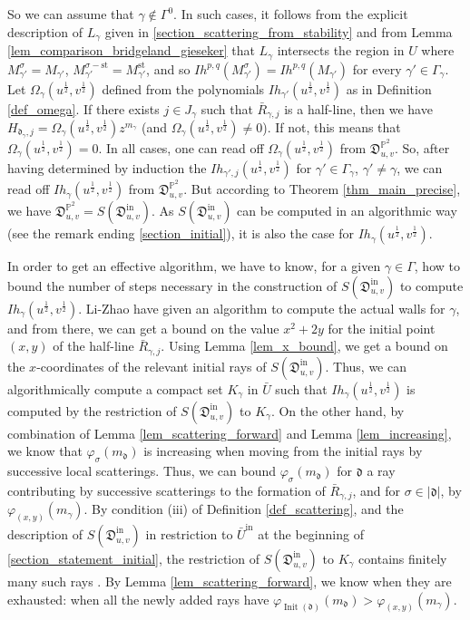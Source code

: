 \documentclass[12pt, a4paper]{amsart}
\newcommand\PP{\mathbb P}
\newcommand\fd{\mathfrak d}
\newcommand\fD{\mathfrak D}
\newcommand\Init{\operatorname{Init}}
\newcommand\st{\mathrm{st}}
\newcommand\iin{\mathrm{in}}
\begin{document}
So we can assume that $\gamma \notin \Gamma^0$. In such cases, it follows from the explicit description of $L_\gamma$ given in \cref{section_scattering_from_stability}
and from Lemma \ref{lem_comparison_bridgeland_gieseker} that
$L_\gamma$ intersects the region in $U$ where $M_{\gamma'}^\sigma=M_{\gamma'}$,
$M_{\gamma'}^{\sigma-\st}=M_{\gamma'}^\st$, and so $Ih^{p,q}(M_{\gamma'}^\sigma)=Ih^{p,q}(M_{\gamma'})$
for every $\gamma' \in \Gamma_\gamma$.
Let $\Omega_\gamma(u^{\frac{1}{2}},v^{\frac{1}{2}})$ defined from the 
polynomials $Ih_{\gamma'}(u^{\frac{1}{2}},v^{\frac{1}{2}})$ as in Definition 
\ref{def_omega}.
If there exists $j \in J_\gamma$ such that $\bar{R}_{\gamma,j}$ is a half-line, then we have  $H_{\fd_\gamma,j}=\Omega_\gamma(u^{\frac{1}{2}},v^{\frac{1}{2}}) z^{m_\gamma}$ (and $\Omega_\gamma(u^{\frac{1}{2}},v^{\frac{1}{2}}) \neq 0$).
If not, this means that $\Omega_\gamma(u^{\frac{1}{2}},v^{\frac{1}{2}})= 0$.
In all cases, one can read off $\Omega_\gamma(u^{\frac{1}{2}},v^{\frac{1}{2}})$
from $\fD_{u,v}^{\PP^2}$.
So, after having determined by induction the $Ih_{\gamma',j}(u^{\frac{1}{2}},
v^{\frac{1}{2}})$ for $\gamma' \in \Gamma_\gamma$, $\gamma' \neq \gamma$, we can read off 
$Ih_\gamma(u^{\frac{1}{2}},v^{\frac{1}{2}})$
from $\fD^{\PP^2}_{u,v}$.
But according to Theorem
\ref{thm_main_precise}, we have 
$\fD_{u,v}^{\PP^2}=S(\fD^\iin_{u,v})$. As 
$S(\fD^\iin_{u,v})$ can be computed in an algorithmic way (see the remark ending
\cref{section_initial}), it is also the case 
for $Ih_\gamma(u^{\frac{1}{2}}, v^{\frac{1}{2}})$.

In order to get an effective algorithm, we have to know, for a given $\gamma \in \Gamma$, how to bound the number of steps necessary in the construction of $S(\fD_{u,v}^{\iin})$
to compute 
$Ih_\gamma(u^{\frac{1}{2}},v^{\frac{1}{2}})$. Li-Zhao \cite{MR3921322} have given an algorithm to compute the actual walls for 
$\gamma$, and from there, we can get a bound on the value $x^2+2y$ for the initial point $(x,y)$ of the half-line $\bar{R}_{\gamma,j}$.
Using Lemma \ref{lem_x_bound}, we get a bound on the $x$-coordinates of the relevant initial rays of $S(\fD^\iin_{u,v})$. Thus, we can algorithmically compute a compact set $K_{\gamma}$ in $\bar{U}$ such that $Ih_\gamma(u^{\frac{1}{2}},v^{\frac{1}{2}})$ is computed by the restriction of 
$S(\fD^\iin_{u,v})$ to $K_\gamma$.
On the other hand, by combination of 
Lemma \ref{lem_scattering_forward} and Lemma \ref{lem_increasing}, we know that 
$\varphi_\sigma(m_\fd)$ is increasing when moving from the initial rays by successive local scatterings. Thus, we can bound $\varphi_\sigma(m_\fd)$ for $\fd$ a ray contributing by successive scatterings to the formation of $\bar{R}_{\gamma,j}$, and for $\sigma \in |\fd|$, by 
$\varphi_{(x,y)}(m_\gamma)$.
By condition (iii) of Definition \ref{def_scattering}, and the description of $S(\fD^\iin_{u,v})$ in restriction to 
$\bar{U}^\iin$ at the beginning of
\cref{section_statement_initial}, the restriction of $S(\fD^\iin_{u,v})$ to
$K_\gamma$ contains finitely many such rays . By Lemma \ref{lem_scattering_forward}, we know when they are exhausted: when all the newly added rays have $\varphi_{\Init(\fd)}(m_\fd)>\varphi_{(x,y)}(m_\gamma)$.
\end{document}
